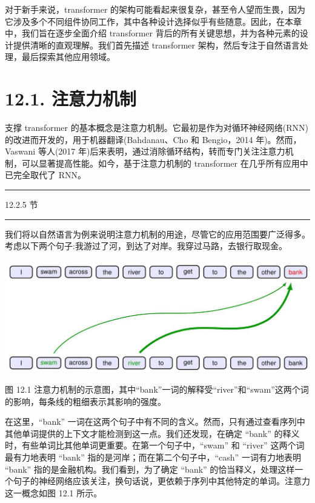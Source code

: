 \documentclass[10pt]{report}
\newcommand{\HRule}{\begin{center}\rule{0.9\linewidth}{0.2mm}\end{center}}
\begin{document}
对于新手来说，transformer 的架构可能看起来很复杂，甚至令人望而生畏，因为它涉及多个不同组件协同工作，其中各种设计选择似乎有些随意。因此，在本章中，我们旨在逐步全面介绍 transformer 背后的所有关键思想，并为各种元素的设计提供清晰的直观理解。我们首先描述 transformer 架构，然后专注于自然语言处理，最后探索其他应用领域。

\section*{12.1. 注意力机制}

支撑 transformer 的基本概念是注意力机制。它最初是作为对循环神经网络(RNN)的改进而开发的，用于机器翻译(Bahdanau、Cho 和 Bengio，2014 年)。然而，Vaswani 等人(2017 年)后来表明，通过消除循环结构，转而专门关注注意力机制，可以显著提高性能。如今，基于注意力机制的 transformer 在几乎所有应用中已完全取代了 RNN。

\HRule

12.2.5 节

\HRule

我们将以自然语言为例来说明注意力机制的用途，尽管它的应用范围要广泛得多。考虑以下两个句子:我游过了河，到达了对岸。我穿过马路，去银行取现金。

\begin{center}
\includegraphics[max width=1.0\textwidth]{images/0194e279-9b28-703a-88f4-c3ac21e2010d_378_248_338_1294_475_0.jpg}
\end{center}
\hspace*{3em} 

图 12.1 注意力机制的示意图，其中“bank”一词的解释受“river”和“swam”这两个词的影响，每条线的粗细表示其影响的强度。

在这里，“bank” 一词在这两个句子中有不同的含义。然而，只有通过查看序列中其他单词提供的上下文才能检测到这一点。我们还发现，在确定 “bank” 的释义时，有些单词比其他单词更重要。在第一个句子中，“swam” 和 “river” 这两个词最有力地表明 “bank” 指的是河岸；而在第二个句子中，“cash” 一词有力地表明 “bank” 指的是金融机构。我们看到，为了确定 “bank” 的恰当释义，处理这样一个句子的神经网络应该关注，换句话说，更依赖于序列中其他特定的单词。注意力这一概念如图 12.1 所示。
\end{document}
